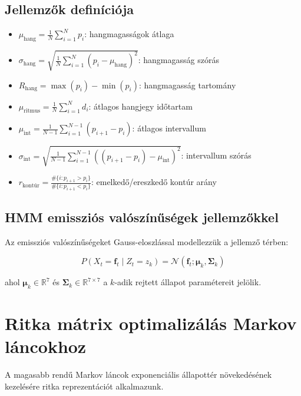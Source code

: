\subsection{Jellemzők definíciója}

\begin{itemize}
    \item $\mu_{\text{hang}} = \frac{1}{N}\sum_{i=1}^N p_i$: hangmagasságok átlaga
    \item $\sigma_{\text{hang}} = \sqrt{\frac{1}{N}\sum_{i=1}^N (p_i - \mu_{\text{hang}})^2}$: hangmagasság szórás
    \item $R_{\text{hang}} = \max(p_i) - \min(p_i)$: hangmagasság tartomány
    \item $\mu_{\text{ritmus}} = \frac{1}{N}\sum_{i=1}^N d_i$: átlagos hangjegy időtartam
    \item $\mu_{\text{int}} = \frac{1}{N-1}\sum_{i=1}^{N-1} (p_{i+1} - p_i)$: átlagos intervallum
    \item $\sigma_{\text{int}} = \sqrt{\frac{1}{N-1}\sum_{i=1}^{N-1} ((p_{i+1} - p_i) - \mu_{\text{int}})^2}$: intervallum szórás
    \item $r_{\text{kontúr}} = \frac{\#\{i: p_{i+1} > p_i\}}{\#\{i: p_{i+1} < p_i\}}$: emelkedő/ereszkedő kontúr arány
\end{itemize}

\subsection{HMM emissziós valószínűségek jellemzőkkel}

Az emissziós valószínűségeket Gauss-eloszlással modellezzük a jellemző térben:

\begin{equation}
P(X_t = \mathbf{f}_t \mid Z_t = z_k) = \mathcal{N}(\mathbf{f}_t; \boldsymbol{\mu}_k, \boldsymbol{\Sigma}_k)
\end{equation}

ahol $\boldsymbol{\mu}_k \in \mathbb{R}^7$ és $\boldsymbol{\Sigma}_k \in \mathbb{R}^{7 \times 7}$ a $k$-adik rejtett állapot paramétereit jelölik.

\section{Ritka mátrix optimalizálás Markov láncokhoz}
\label{proof:sparse_optimization}

A magasabb rendű Markov láncok exponenciális állapottér növekedésének kezelésére ritka reprezentációt alkalmazunk.

